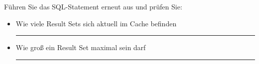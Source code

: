    \item F\"uhren Sie das SQL-Statement erneut aus und pr\"ufen Sie:
    \begin{itemize}
      \item Wie viele Result Sets sich aktuell im Cache befinden

        \rule{0.88\textwidth}{0.5pt}

      \item Wie gro\ss{} ein Result Set maximal sein darf

        \rule{0.88\textwidth}{0.5pt}

    \end{itemize}
